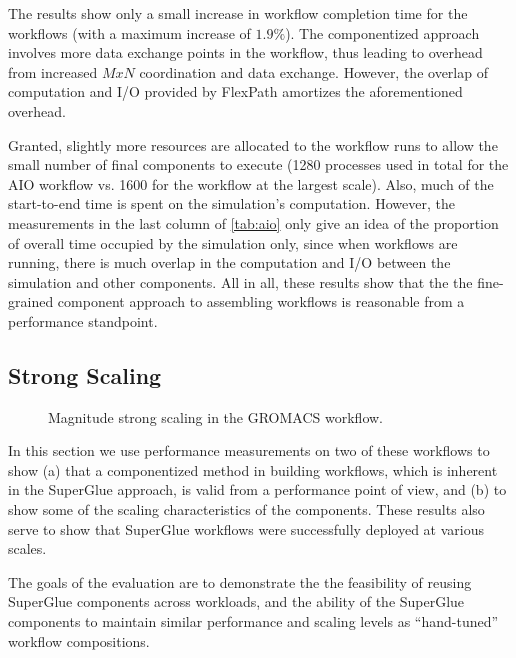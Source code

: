 The results show only a small increase in
workflow completion time for the \sys
workflows (with a maximum increase of $1.9 \%$).
The componentized
approach involves more data exchange points
in the workflow, thus leading to
overhead from increased $MxN$ coordination and data exchange.
However, the overlap of computation and I/O provided by FlexPath
amortizes the aforementioned overhead.

Granted, slightly more resources are allocated to the
\sys workflow runs to allow the small number
of final components to execute (1280 processes
used in total for the AIO workflow vs. 1600 for
the \sys workflow at the largest scale).
Also, much of the start-to-end time is spent on
the simulation's computation.
However, the measurements in the last column
of \autoref{tab:aio}
only give an idea of the proportion of 
overall time occupied by the simulation only,
since when workflows are running, there is much
overlap in the computation and I/O between the
simulation and other components. All in all,
these results show that the 
the fine-grained component approach
to assembling workflows
is reasonable from a performance standpoint.

\subsection{Strong Scaling}
\begin{figure}
  \centering
  
  \caption{Magnitude strong scaling in the GROMACS workflow.}
  \label{fig:gtcp-strong}
  \vspace{-0.25in}
\end{figure}



In this section we use
performance measurements on two of these workflows
to show (a) that a componentized method in
building workflows, which is inherent in the SuperGlue approach,
is valid from a performance point of view,
and (b) to show some of the scaling characteristics
of the components.
These results also serve to show that
SuperGlue workflows were successfully
deployed at various
scales.

The goals of the evaluation are to demonstrate the  the feasibility of reusing
  SuperGlue components across workloads, and the ability of the
  SuperGlue components to maintain similar performance and scaling
levels as ``hand-tuned'' workflow compositions. 
\fi

